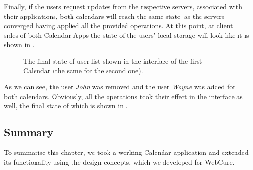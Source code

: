 Finally, if the users request updates from the respective servers, associated with their applications, both calendars will reach the same state, as the servers converged having applied all the provided operations. At this point, at client sides of both Calendar Apps the state of the users' local storage will look like it is shown in .

\begin{figure}[!htb]
    \begin{center}
    \setlength{\fboxsep}{4pt}%
    \setlength{\fboxrule}{1pt}%
    {\scriptsize%
     }
    \caption {The final state of user list shown in the interface of the first Calendar (the same for the second one).}
    \label{fig:ev-fig-3}
\end{center}
\end{figure}

As we can see, the user \textit{John} was removed and the user \textit{Wayne} was added for both calendars. Obviously, all the operations took their effect in the interface as well, the final state of which is shown in .

\subsection*{Summary}

To summarise this chapter, we took a working Calendar application and extended its functionality using the design concepts, which we developed for WebCure. 

